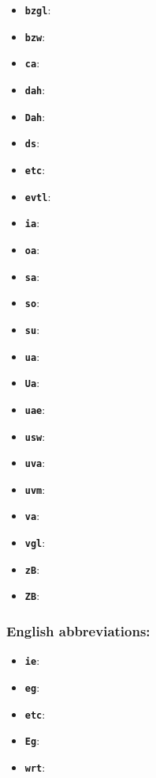 \documentclass[english]{hgbarticle}
\begin{document}
\begin{itemize}
    \item \textbf{\texttt{{\bs}bzgl}}: 	\bzgl
    \item \textbf{\texttt{{\bs}bzw}}: 	\bzw
    \item \textbf{\texttt{{\bs}ca}}: 		\ca
    \item \textbf{\texttt{{\bs}dah}}: 	\dah
    \item \textbf{\texttt{{\bs}Dah}}: 	\Dah
    \item \textbf{\texttt{{\bs}ds}}: 		\ds
    \item \textbf{\texttt{{\bs}etc}}: 	\etc
    \item \textbf{\texttt{{\bs}evtl}}: 	\evtl
    \item \textbf{\texttt{{\bs}ia}}: 		\ia
		\item \textbf{\texttt{{\bs}oa}}: 		\oa
    \item \textbf{\texttt{{\bs}sa}}: 		\sa
    \item \textbf{\texttt{{\bs}so}}: 		\so
    \item \textbf{\texttt{{\bs}su}}: 		\su
    \item \textbf{\texttt{{\bs}ua}}: 		\ua
    \item \textbf{\texttt{{\bs}Ua}}: 		\Ua
    \item \textbf{\texttt{{\bs}uae}}: 	\uae
    \item \textbf{\texttt{{\bs}usw}}: 	\usw
    \item \textbf{\texttt{{\bs}uva}}: 	\uva
    \item \textbf{\texttt{{\bs}uvm}}: 	\uvm
    \item \textbf{\texttt{{\bs}va}}: 		\va
    \item \textbf{\texttt{{\bs}vgl}}: 	\vgl
    \item \textbf{\texttt{{\bs}zB}}: 		\zB
    \item \textbf{\texttt{{\bs}ZB}}: 		\ZB
\end{itemize}

\subsubsection*{English abbreviations:}

\begin{itemize}
    \item \textbf{\texttt{{\bs}ie}}: 	\ie
    \item \textbf{\texttt{{\bs}eg}}: 	\eg
    \item \textbf{\texttt{{\bs}etc}}: \etc
    \item \textbf{\texttt{{\bs}Eg}}: 	\Eg
    \item \textbf{\texttt{{\bs}wrt}}: \wrt
\end{itemize}
\end{document}
